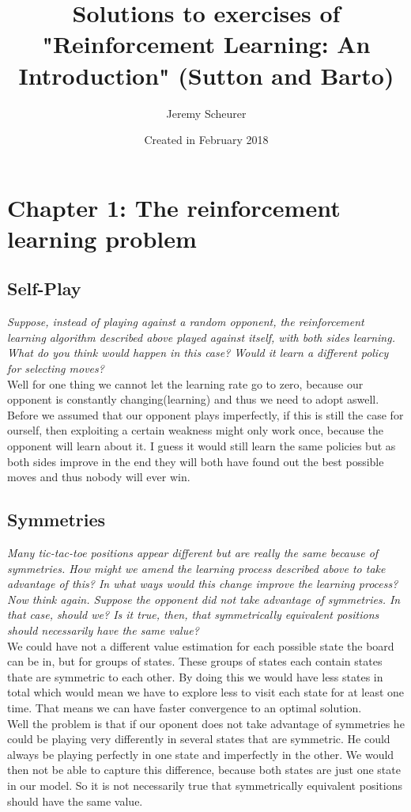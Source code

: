 \documentclass[12pt,a4paper]{article}
\author{Jeremy Scheurer}
\title{Solutions to exercises of "Reinforcement Learning: An Introduction" (Sutton and Barto)}
\date{Created in February 2018}
\begin{document}
\maketitle
\tableofcontents
\newpage
	
\section{Chapter 1: The reinforcement learning problem}
\subsection{Self-Play }
\textit{Suppose, instead of playing against a random opponent, the reinforcement learning algorithm 		described above played against itself, with both sides learning. What do you think would happen in this case? Would it learn a different policy for selecting moves?}\\

Well for one thing we cannot let the learning rate go to zero, because our opponent is constantly changing(learning) and thus we need to adopt aswell. Before we assumed that our opponent plays imperfectly, if this is still the case for ourself, then exploiting a certain weakness might only work once, because the opponent will learn about it. I guess it would still learn the same policies but as both sides improve in the end they will both have found out the best possible moves and thus nobody will ever win.

\subsection{Symmetries}
\textit{Many tic-tac-toe positions appear different but are really the same because of symmetries. How might we amend the learning process described above to take advantage of this? In what ways would this change improve the learning process? Now think again. Suppose the opponent did not take advantage of symmetries. In that case, should we? Is it true, then, that symmetrically equivalent positions should necessarily have the same value?} \\ 

We could have not a different value estimation for each possible state the board can be in, but for groups of states. These groups of states each contain states thate are symmetric to each other. By doing this we would have less states in total which would mean we have to explore less to visit each state for at least one time. That means we can have faster convergence to an optimal solution. \\
Well the problem is that if our oponent does not take advantage of symmetries he could be playing very differently in several states that are symmetric. He could always be playing perfectly in one state and imperfectly in the other. We would then not be able to capture this difference, because both states are just one state in our model. So it is not necessarily true that symmetrically equivalent positions should have the same value.
\end{document}
